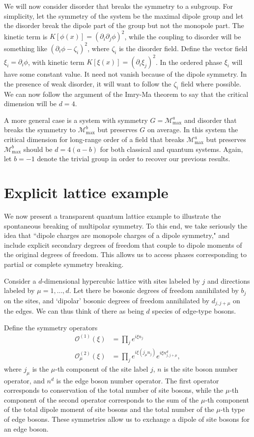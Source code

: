 \documentclass[pra,aps,twocolumn, amsfonts,amsmath,amssymb,nofootinbib,superscriptaddress]{revtex4-2}
\newcommand{\op}[1]{\mathcal{O}^{(#1)}}
\newcommand{\nn}{\nonumber\\}
\renewcommand{\max}{\text{max}}
\newcommand{\mmax}[1]{\mathcal{M}^{#1}_\max}
\begin{document}
We will now consider disorder that breaks the symmetry to a subgroup. For simplicity, let the symmetry of the system be the maximal dipole group and let the disorder break the dipole part of the group but not the monopole part. The kinetic term is $K[\phi(x)]= (\partial_i \partial_j \phi)^2$, while the coupling to disorder will be something like $(\partial_i\phi - \zeta_i)^2$, where $\zeta_i$ is the disorder field. 
Define the vector field $\xi_i = \partial_i\phi$, with kinetic term $K[\xi(x)]= (\partial_i \xi_j)^2$. In the ordered phase $\xi_i$ will have some constant value. It need not vanish because of the dipole symmetry. In the presence of weak disorder, it will want to follow the $\zeta_i$ field where possible. We can now follow the argument of the Imry-Ma theorem to say that the critical dimension will be $d=4$.

A more general case is a system with symmetry $G = \mathcal{M}_\max^a$ and disorder that breaks the symmetry to $\mathcal{M}_\max^b$ but preserves $G$ on average. In this system the critical dimension for long-range order of a field that breaks $\mmax{a}$ but preserves $\mmax{b}$ should be $d=4(a-b)$ for both classical and quantum systems. Again, let $b=-1$ denote the trivial group in order to recover our previous results.

\section{Explicit lattice example} \label{sec:example}

We now present a transparent quantum lattice example to illustrate the spontaneous breaking of multipolar symmetry. To this end, we take seriously the idea that ``dipole charges are monopole charges of a dipole symmetry," and include explicit secondary degrees of freedom that couple to dipole moments of the original degrees of freedom. This allows us to access phases corresponding to partial or complete symmetry breaking. 

Consider a $d$-dimensional hypercubic lattice with sites labeled by $j$ and directions labeled by $\mu = 1,\dots,d$. Let there be bosonic degrees of freedom annihilated by $b_j$ on the sites, and `dipolar' bosonic degrees of freedom annihilated by $d_{j,j+\mu}$ on the edges. We can thus think of there as being $d$ species of edge-type bosons.

Define the symmetry operators
\begin{align}
\op{1}(\xi) &= \prod_je^{i\xi n_j}\nn
\op{2}_\mu(\xi) &= \prod_j e^{i\xi (j_\mu n_j)}e^{i\xi n^d_{j,j+\mu}},
\end{align}
where $j_\mu$ is the $\mu$-th component of the site label $j$, $n$ is the site boson number operator, and $n^d$ is the edge boson number operator.
The first operator corresponds to conservation of the total number of site bosons, while the $\mu$-th component of the second operator corresponds to the sum of the $\mu$-th component of the total dipole moment of site bosons and the total number of the $\mu$-th type of edge bosons. These symmetries allow us to exchange a dipole of site bosons for an edge boson. 
\end{document}
